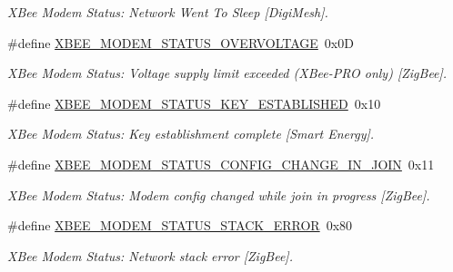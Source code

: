 \begin{DoxyCompactItemize}
\begin{DoxyCompactList}\small\item\em X\-Bee Modem Status\-: Network Went To Sleep \mbox{[}Digi\-Mesh\mbox{]}. \end{DoxyCompactList}\item 
\hypertarget{group__xbee__device_ga94ea3df8c78c7789b55cfa9784ee3dc4}{\#define \hyperlink{group__xbee__device_ga94ea3df8c78c7789b55cfa9784ee3dc4}{X\-B\-E\-E\-\_\-\-M\-O\-D\-E\-M\-\_\-\-S\-T\-A\-T\-U\-S\-\_\-\-O\-V\-E\-R\-V\-O\-L\-T\-A\-G\-E}~0x0\-D}\label{group__xbee__device_ga94ea3df8c78c7789b55cfa9784ee3dc4}

\begin{DoxyCompactList}\small\item\em X\-Bee Modem Status\-: Voltage supply limit exceeded (X\-Bee-\/\-P\-R\-O only) \mbox{[}Zig\-Bee\mbox{]}. \end{DoxyCompactList}\item 
\hypertarget{group__xbee__device_ga190661653f541a9b694103dbd27fd284}{\#define \hyperlink{group__xbee__device_ga190661653f541a9b694103dbd27fd284}{X\-B\-E\-E\-\_\-\-M\-O\-D\-E\-M\-\_\-\-S\-T\-A\-T\-U\-S\-\_\-\-K\-E\-Y\-\_\-\-E\-S\-T\-A\-B\-L\-I\-S\-H\-E\-D}~0x10}\label{group__xbee__device_ga190661653f541a9b694103dbd27fd284}

\begin{DoxyCompactList}\small\item\em X\-Bee Modem Status\-: Key establishment complete \mbox{[}Smart Energy\mbox{]}. \end{DoxyCompactList}\item 
\hypertarget{group__xbee__device_ga0e952a93b4cabed4b442f92ebe1b3066}{\#define \hyperlink{group__xbee__device_ga0e952a93b4cabed4b442f92ebe1b3066}{X\-B\-E\-E\-\_\-\-M\-O\-D\-E\-M\-\_\-\-S\-T\-A\-T\-U\-S\-\_\-\-C\-O\-N\-F\-I\-G\-\_\-\-C\-H\-A\-N\-G\-E\-\_\-\-I\-N\-\_\-\-J\-O\-I\-N}~0x11}\label{group__xbee__device_ga0e952a93b4cabed4b442f92ebe1b3066}

\begin{DoxyCompactList}\small\item\em X\-Bee Modem Status\-: Modem config changed while join in progress \mbox{[}Zig\-Bee\mbox{]}. \end{DoxyCompactList}\item 
\hypertarget{group__xbee__device_gae6c193c6ae6c9ed32dc9375fdf24abcb}{\#define \hyperlink{group__xbee__device_gae6c193c6ae6c9ed32dc9375fdf24abcb}{X\-B\-E\-E\-\_\-\-M\-O\-D\-E\-M\-\_\-\-S\-T\-A\-T\-U\-S\-\_\-\-S\-T\-A\-C\-K\-\_\-\-E\-R\-R\-O\-R}~0x80}\label{group__xbee__device_gae6c193c6ae6c9ed32dc9375fdf24abcb}

\begin{DoxyCompactList}\small\item\em X\-Bee Modem Status\-: Network stack error \mbox{[}Zig\-Bee\mbox{]}. \end{DoxyCompactList}\end{DoxyCompactItemize}
